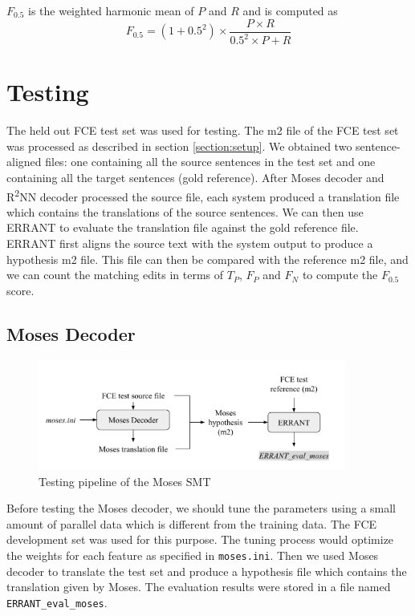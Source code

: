 \documentclass[12pt,a4paper,twoside,openright]{report}
\begin{document}
$F_{0.5}$ is the weighted harmonic mean of $P$ and $R$ and is computed as 
\[F_{0.5}=(1+0.5^2)\times\frac{P\times R}{0.5^2\times P+R}\]

\section{Testing}
The held out FCE test set was used for testing. The m2 file of the FCE test set was processed as described in section \ref{section:setup}. We obtained two sentence-aligned files: one containing all the source sentences in the test set and one containing all the target sentences (gold reference). After Moses decoder and R\textsuperscript{2}NN decoder processed the source file, each system produced a translation file which contains the translations of the source sentences. We can then use ERRANT to evaluate the translation file against the gold reference file. ERRANT first aligns the source text with the system output to produce a hypothesis m2 file. This file can then be compared with the reference m2 file, and we can count the matching edits in terms of $T_P$, $F_P$ and $F_N$ to compute the $F_{0.5}$ score.

\subsection{Moses Decoder}
\begin{figure}[ht]
\centering
\includegraphics[width=0.9\textwidth]{images/moses_test.png}
\caption{Testing pipeline of the Moses SMT}
\label{fig:moses_test}
\end{figure}

Before testing the Moses decoder, we should tune the parameters using a small amount of parallel data which is different from the training data. The FCE development set was used for this purpose. The tuning process would optimize the weights for each feature as specified in \texttt{moses.ini}. Then we used Moses decoder to translate the test set and produce a hypothesis file which contains the translation given by Moses. The evaluation results were stored in a file named \texttt{ERRANT\_eval\_moses}.
\end{document}
